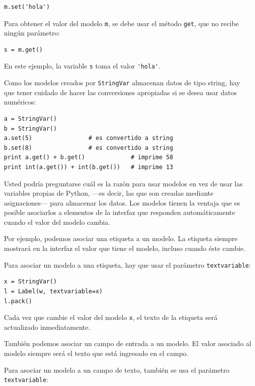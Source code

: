 \begin{lstlisting}
m.set('hola')
\end{lstlisting}

Para obtener el valor del modelo \lstinline!m!, se debe usar el método
\lstinline!get!, que no recibe ningún parámetro:

\begin{lstlisting}
s = m.get()
\end{lstlisting}

En este ejemplo, la variable \lstinline!s! toma el valor
\lstinline!'hola'!.

Como los modelos creados por \lstinline!StringVar! almacenan datos de
tipo string, hay que tener cuidado de hacer las conversiones apropiadas
si se desea usar datos numéricos:

\begin{lstlisting}
a = StringVar()
b = StringVar()
a.set(5)                # es convertido a string
b.set(8)                # es convertido a string
print a.get() + b.get()             # imprime 58
print int(a.get()) + int(b.get())   # imprime 13
\end{lstlisting}

Usted podría preguntarse cuál es la razón para usar modelos en vez de
usar las variables propias de Python, ---es decir, las que son creadas
mediante asignaciones--- para almacenar los datos. Los modelos tienen la
ventaja que es posible asociarlos a elementos de la interfaz que
responden automáticamente cuando el valor del modelo cambia.

Por ejemplo, podemos asociar una etiqueta a un modelo. La etiqueta
siempre mostrará en la interfaz el valor que tiene el modelo, incluso
cuando éste cambie.

Para asociar un modelo a una etiqueta, hay que usar el parámetro
\lstinline!textvariable!:

\begin{lstlisting}
x = StringVar()
l = Label(w, textvariable=x)
l.pack()
\end{lstlisting}

Cada vez que cambie el valor del modelo \lstinline!x!, el texto de la
etiqueta será actualizado inmediatamente.

También podemos asociar un campo de entrada a un modelo. El valor
asociado al modelo siempre será el texto que está ingresado en el campo.

Para asociar un modelo a un campo de texto, también se usa el parámetro
\lstinline!textvariable!:

